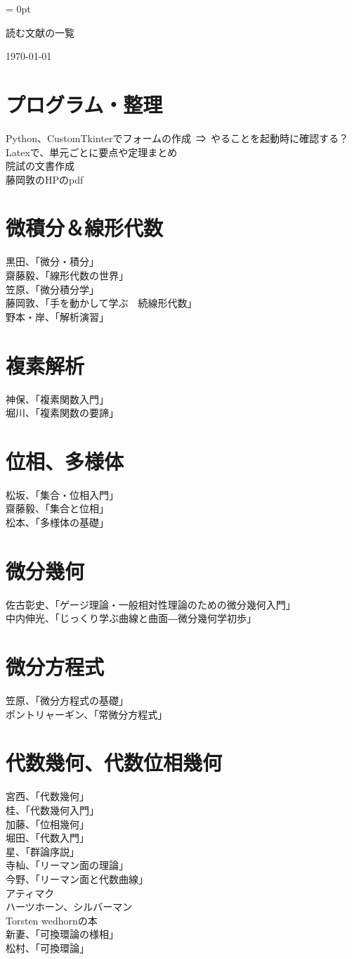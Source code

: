\documentclass{jsarticle}
\begin{document}
\parindent = 0pt
\begin{center}
{\LARGE 読む文献の一覧} 
\end{center}
\begin{flushright}
\today
\end{flushright}
\section{プログラム・整理}
Python、CustomTkinterでフォームの作成\ ⇒\ やることを起動時に確認する？\\
Latexで、単元ごとに要点や定理まとめ\\
院試の文書作成\\
藤岡敦のHPのpdf
\section{微積分＆線形代数}
黒田、「微分・積分」\\
齋藤毅、「線形代数の世界」\\
笠原、「微分積分学」\\
藤岡敦、「手を動かして学ぶ　続線形代数」\\
野本・岸、「解析演習」
\section{複素解析}
神保、「複素関数入門」\\
堀川、「複素関数の要諦」
\section{位相、多様体}
松坂、「集合・位相入門」\\
齋藤毅、「集合と位相」\\
松本、「多様体の基礎」
\section{微分幾何}
佐古彰史、「ゲージ理論・一般相対性理論のための微分幾何入門」\\
中内伸光、「じっくり学ぶ曲線と曲面―微分幾何学初歩」
\section{微分方程式}
笠原、「微分方程式の基礎」\\
ポントリャーギン、「常微分方程式」
\section{代数幾何、代数位相幾何}
宮西、「代数幾何」\\
桂、「代数幾何入門」\\
加藤、「位相幾何」\\
堀田、「代数入門」\\
星、「群論序説」\\
寺杣、「リーマン面の理論」\\
今野、「リーマン面と代数曲線」\\
アティマク\\
ハーツホーン、シルバーマン\\
Torsten wedhornの本\\
新妻、「可換環論の様相」\\
松村、「可換環論」
\end{document}
